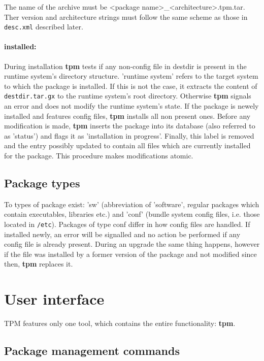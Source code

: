 \documentclass[a4paper]{article}
\newcommand{\file}[1]{\texttt{#1}}
\newcommand{\program}[1]{\textbf{#1}}
\begin{document}
	\noindent
	The name of the archive must be <package name>\_<architecture>.tpm.tar. Ther version and architecture strings must follow the same scheme as those in \file{desc.xml} described later.
	
	\paragraph{installed:}
	During installation \program{tpm} tests if any non-config file in destdir is present in the runtime system's directory structure. 'runtime system' refers to the target system to which the package is installed. If this is not the case, it extracts the content of \file{destdir.tar.gx} to the runtime system's root directory. Otherwise \program{tpm} signals an error and does not modify the runtime system's state. If the package is newely installed and features config files, \program{tpm} installs all non present ones. Before any modification is made, \program{tpm} inserts the package into its database (also referred to as 'status') and flags it as 'installation in progress'. Finally, this label is removed and the entry possibly updated to contain all files which are currently installed for the package. This procedure makes modifications atomic.
	
	\subsection{Package types}
	\label{sec:package_types}
	
	To types of package exist: 'sw' (abbreviation of 'software', regular packages which contain executables, libraries etc.) and 'conf' (bundle system config files, i.e. those located in \file{/etc}). Packages of type conf differ in how config files are handled. If installed newly, an error will be signalled and no action be performed if any config file is already present. During an upgrade the same thing happens, however if the file was installed by a former version of the package and not modified since then, \program{tpm} replaces it.
	
	\section{User interface}
	\label{sec:user_interface}
	
	TPM features only one tool, which contains the entire functionality: \program{tpm}.
	
	\subsection{Package management commands}
	\label{sec:package_management_commands}
	
\end{document}
